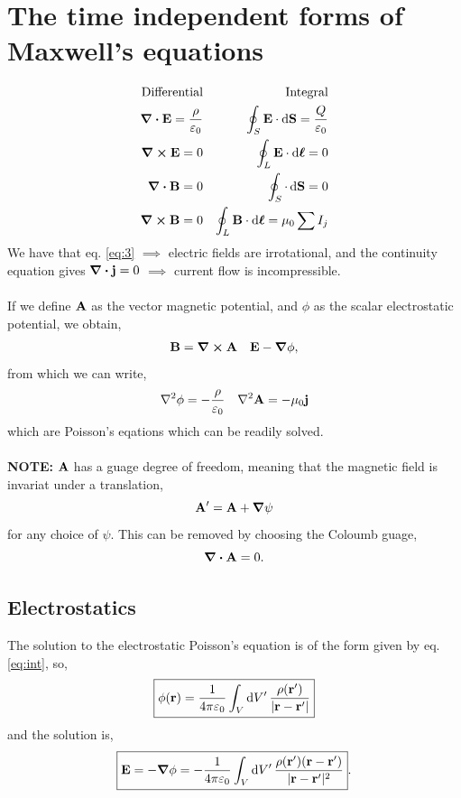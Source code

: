 \documentclass{book}
\begin{document}
\section{The time independent forms of Maxwell's equations}
\begin{align}
	\text{Differential} && \text{Integral}\\
	\div{\vb{E}} = \frac{\rho}{\varepsilon_0} && \oint_S\vb{E}\cdot\dd{\vb{S}} = \frac{Q}{\varepsilon_0} \label{eq:1} \\
	\curl{\vb{E}} = 0 && \oint_L \vb{E}\cdot\dd{\vb*{\ell}} = 0 \label{eq:2}\\
	\div{\vb{B}} = 0 && \oint_S \cdot\dd{\vb{S}} = 0 \label{eq:3}\\
	\curl{\vb{B}} = 0 && \oint_L\vb{B}\cdot\dd{\vb*{\ell}} = \mu_0 \sum I_j \label{eq:4}
\end{align}
We have that eq. \eqref{eq:3} $\implies$ electric fields are irrotational, and the continuity equation gives $\div{\vb{j}} = 0$ $\implies$ current flow is incompressible.
\\\\
If we define $\vb{A}$ as the vector magnetic potential, and $\phi$ as the scalar electrostatic potential, we obtain,
\begin{align}
	\vb{B} = \curl{\vb{A}} && \vb{E} - \grad \phi, \label{eq:potentials}
\end{align}
from which we can write,
\begin{align}
	\laplacian \phi = -\frac{\rho}{\varepsilon_0} && \laplacian \vb{A} = -\mu_0\vb{j}
\end{align}
which are Poisson's eqations which can be readily solved.
\\\\
\textbf{NOTE:} $\vb{A}$ has a guage degree of freedom, meaning that the magnetic field is invariat under a translation,
\begin{equation}
	\vb{A}' = \vb{A} + \grad \psi
\end{equation}
for any choice of $\psi$. This can be removed by choosing the Coloumb guage,
\begin{equation}
	\div{\vb{A}} = 0.
\end{equation}
\subsection{Electrostatics}
The solution to the electrostatic Poisson's equation is of the form given by eq. \eqref{eq:int}, so,
\begin{equation}
	\boxed{\phi(\vb{r}) = \frac{1}{4\pi \varepsilon_0}\int_{V}\dd{V'} \frac{\rho(\vb{r}')}{|\vb{r} - \vb{r}'|}}
\end{equation}
and the solution is,
\begin{equation}
	\begin{split}
	\boxed{\vb{E} = -\grad\phi = -\frac{1}{4\pi\varepsilon_0} \int_V \dd{V'} \frac{\rho(\vb{r}')(\vb{r} - \vb{r}')}{|\vb{r} - \vb{r}'|^2}}.
	\end{split}
\end{equation}
\end{document}
